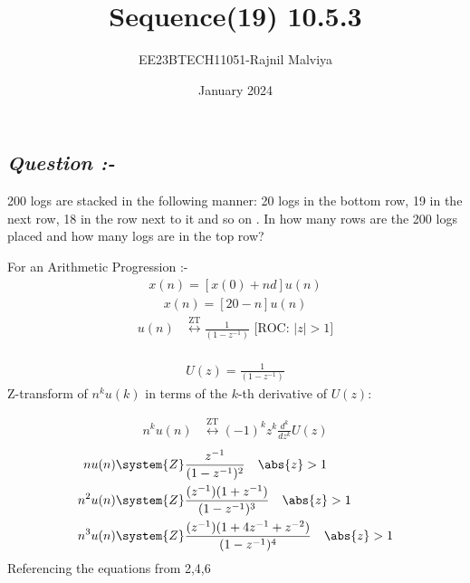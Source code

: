 \documentclass[journal,12pt,twocolumn]{IEEEtran}
\theoremstyle{remark}
\begin{document}
\title{Sequence(19) 10.5.3}
\author{EE23BTECH11051-Rajnil Malviya}
\date{January 2024}
\maketitle
\subsection*{\textit{Question :-}}
200 logs are stacked in the following manner: 20 logs in the bottom row, 19 in the next row,
18 in the row next to it and so on . In how many rows are the 200 logs placed
and how many logs are in the top row?

\begin{table}[h!]
   
        
       
    \end{table}
For an Arithmetic Progression :-
\begin{align}x(n)=[x(0)+n d]u(n)\end{align}
\begin{align}x(n)=[20-n]u(n)\end{align}
\begin{align}
   u(n) &\overset{\text{ZT}}{\longleftrightarrow} \frac{1}{(1 - z^{-1})}
    \text{ [ROC: } \lvert z \rvert > 1\text{]}\end{align} \\
  \begin{align}  U(z)=\frac{1}{(1 - z^{-1})}\end{align}
Z-transform of \(n^ku(k)\) in terms of the \(k\)-th derivative of \(U(z)\):

\begin{align}
n^k u(n) &\overset{\text{ZT}}{\longleftrightarrow} (-1)^k z^k \frac{d^k}{dz^k}U(z)
\end{align}
\begin{align}
    nu(n) &\system{Z} \frac{z^{-1}}{(1 - z^{-1})^2} \quad \abs{ z} > 1  \label{eq:3} \\
    n^2u(n) &\system{Z} \frac{(z^{-1})(1+z^{-1})}{(1 - z^{-1})^3} \quad \abs{ z} > 1  \label{eq:4} \\
    n^3u(n) &\system{Z} \frac{(z^{-1})(1+4z^{-1}+z^{-2})}{(1 - z^{-1})^4} \quad \abs{ z} > 1  \label{eq:5} 
\end{align}
Referencing the equations from 2,4,6
\end{document}
